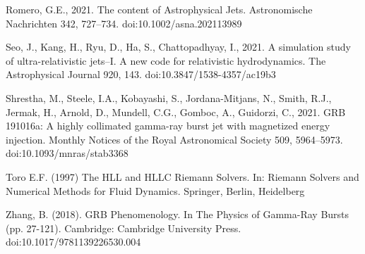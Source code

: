 \documentclass[12pt,a4paper]{book}
\begin{document}
\begin{thebibliography}{40}
 Romero, G.E., 2021. The content of Astrophysical Jets. Astronomische Nachrichten 342, 727–734. doi:10.1002/asna.202113989 

Seo, J., Kang, H., Ryu, D., Ha, S., Chattopadhyay, I., 2021. A simulation study of ultra-relativistic jets–I. A new code for relativistic hydrodynamics. 
The Astrophysical Journal 920, 143. doi:10.3847/1538-4357/ac19b3 

 Shrestha, M., Steele, I.A., Kobayashi, S., Jordana-Mitjans, N., Smith, R.J., Jermak, H., Arnold, D., Mundell, C.G., Gomboc, A., Guidorzi, C., 2021. GRB 191016a: A highly collimated gamma-ray 
burst jet with magnetized energy injection. Monthly Notices of the Royal Astronomical Society 509, 5964–5973. doi:10.1093/mnras/stab3368 

 Toro E.F. (1997) The HLL and HLLC Riemann Solvers. In: Riemann Solvers and Numerical Methods for Fluid Dynamics. Springer, Berlin, Heidelberg

Zhang, B. (2018). GRB Phenomenology. In The Physics of Gamma-Ray Bursts (pp. 27-121). Cambridge: Cambridge University Press. doi:10.1017/9781139226530.004


\end{thebibliography}
\end{document}
